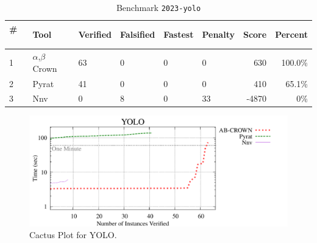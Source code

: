 
\begin{table}[h]
\begin{center}
\caption{Benchmark \texttt{2023-yolo}} \label{tab:cat_{cat}}
{\setlength{\tabcolsep}{2pt}
\begin{tabular}[h]{@{}llllllrr@{}}
\toprule
\textbf{\# ~} & \textbf{Tool} & \textbf{Verified} & \textbf{Falsified} & \textbf{Fastest} & \textbf{Penalty} & \textbf{Score} & \textbf{Percent}\\
\midrule
1 & $\alpha$,$\beta$ Crown & 63 & 0 & 0 & 0 & 630 & 100.0\% \\
2 & Pyrat & 41 & 0 & 0 & 0 & 410 & 65.1\% \\
3 & Nnv & 0 & 8 & 0 & 33 & -4870 & 0\% \\
\bottomrule
\end{tabular}
}
\end{center}
\end{table}



\begin{figure}[h]
\centerline{\includegraphics[width=\textwidth]{cactus/2023_yolo.pdf}}
\caption{Cactus Plot for YOLO.}
\label{fig:quantPic}
\end{figure}

